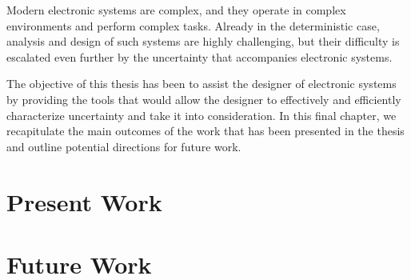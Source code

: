 Modern electronic systems are complex, and they operate in complex environments
and perform complex tasks. Already in the deterministic case, analysis and
design of such systems are highly challenging, but their difficulty is escalated
even further by the uncertainty that accompanies electronic systems.

The objective of this thesis has been to assist the designer of electronic
systems by providing the tools that would allow the designer to effectively and
efficiently characterize uncertainty and take it into consideration. In this
final chapter, we recapitulate the main outcomes of the work that has been
presented in the thesis and outline potential directions for future work.

\section{Present Work}

\section{Future Work}
